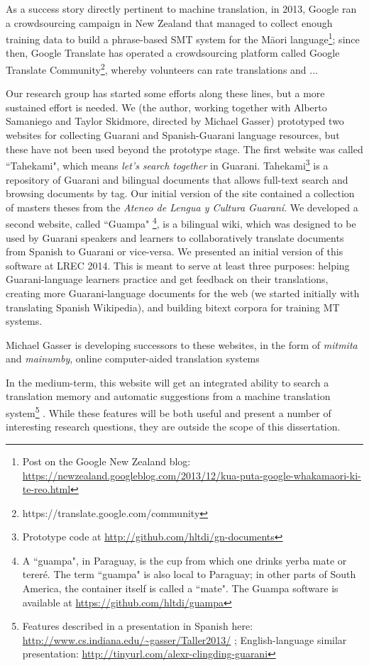 As a success story directly pertinent to machine translation, in 2013, Google
ran a crowdsourcing campaign in New Zealand that managed to collect
enough training data to build a phrase-based SMT system for the Māori
language\footnote{Post on the Google New Zealand blog:
\url{https://newzealand.googleblog.com/2013/12/kua-puta-google-whakamaori-ki-te-reo.html}};
since then, Google Translate has operated a crowdsourcing platform called
Google Translate Community\footnote{https://translate.google.com/community},
whereby volunteers can rate translations and  ...

Our research group has started some efforts along these lines, but a more
sustained effort is needed. We (the author, working together with Alberto
Samaniego and Taylor Skidmore, directed by Michael Gasser) prototyped two
websites for collecting Guarani and Spanish-Guarani language resources, but
these have not been used beyond the prototype stage.
The first website was called ``Tahekami", which means \emph{let's search
together} in Guarani. Tahekami\footnote{Prototype code at
\url{http://github.com/hltdi/gn-documents}} is a repository of Guarani and
bilingual documents that allows full-text search and browsing documents by tag.
Our initial version of the site contained a collection of masters theses from
the \emph{Ateneo de Lengua y Cultura Guaraní}.
We developed a second website, called ``Guampa" \footnote{A ``guampa", in
Paraguay, is the cup from which one drinks yerba mate or tereré. The term
``guampa" is also local to Paraguay; in other parts of South America, the
container itself is called a ``mate". The Guampa software is available at
\url{https://github.com/hltdi/guampa}}, is a bilingual wiki, which was designed
to be used by Guarani speakers and learners to collaboratively translate
documents from Spanish to Guarani or vice-versa. We presented an initial version
of this software at LREC 2014\cite{RUDNICK14.151}. This is meant to serve at
least three purposes: helping Guarani-language learners practice and get
feedback on their translations, creating more Guarani-language documents for the
web (we started initially with translating Spanish Wikipedia), and building
bitext corpora for training MT systems.

Michael Gasser is developing successors to these websites, in the form of
\emph{mitmita} and \emph{mainumby}, online computer-aided translation systems

In the medium-term, this website will get an integrated ability to search
a translation memory and automatic suggestions from a machine translation
system\footnote{Features described in a presentation in Spanish here:
\url{http://www.cs.indiana.edu/~gasser/Taller2013/} ; English-language similar
presentation: \url{http://tinyurl.com/alexr-clingding-guarani} }
. While these features will be both useful and present a number of
interesting research questions, they are outside the scope of this
dissertation.

